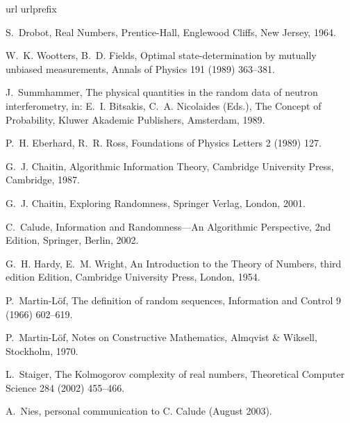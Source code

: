 \documentclass{elsart}
\begin{document}
\begin{thebibliography}{10}
\expandafter\ifx\csname url\endcsname\relax
  \def\url#1{\texttt{#1}}\fi
\expandafter\ifx\csname urlprefix\endcsname\relax\def\urlprefix{URL }\fi

S.~Drobot, Real Numbers, Prentice-Hall, Englewood Cliffs, New Jersey, 1964.

W.~K. Wootters, B.~D. Fields, Optimal state-determination by mutually unbiased
  measurements, Annals of Physics 191 (1989) 363--381.

J.~Summhammer, The physical quantities in the random data of neutron
  interferometry, in: E.~I. Bitsakis, C.~A. Nicolaides (Eds.), The Concept of
  Probability, Kluwer Akademic Publishers, Amsterdam, 1989.

P.~H. Eberhard, R.~R. Ross, Foundations of Physics Letters 2 (1989) 127.

G.~J. Chaitin, Algorithmic Information Theory, Cambridge University Press,
  Cambridge, 1987.

G.~J. Chaitin, Exploring Randomness, Springer Verlag, London, 2001.

C.~Calude, Information and Randomness---An Algorithmic Perspective, 2nd
  Edition, Springer, Berlin, 2002.

G.~H. Hardy, E.~M. Wright, An Introduction to the Theory of Numbers, third
  edition Edition, Cambridge University Press, London, 1954.

P.~Martin-L{\"{o}}f, The definition of random sequences, Information and
  Control 9 (1966) 602--619.

P.~Martin-L{\"{o}}f, Notes on Constructive Mathematics, Almqvist \& Wiksell,
  Stockholm, 1970.

L.~Staiger, The {K}olmogorov complexity of real numbers, Theoretical Computer
  Science 284 (2002) 455--466.

A.~Nies, personal communication to {C}. {C}alude (August 2003).

\end{thebibliography}
\end{document}

